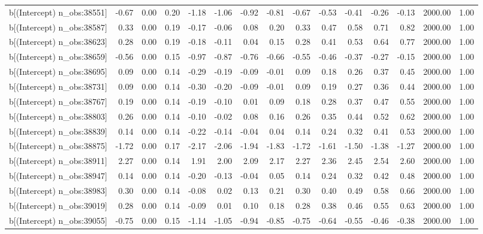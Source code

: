 \begin{table}[ht]
\begin{tabular}{rrrrrrrrrrrrrrr}
  b[(Intercept) n\_obs:38551] & -0.67 & 0.00 & 0.20 & -1.18 & -1.06 & -0.92 & -0.81 & -0.67 & -0.53 & -0.41 & -0.26 & -0.13 & 2000.00 & 1.00 \\ 
  b[(Intercept) n\_obs:38587] & 0.33 & 0.00 & 0.19 & -0.17 & -0.06 & 0.08 & 0.20 & 0.33 & 0.47 & 0.58 & 0.71 & 0.82 & 2000.00 & 1.00 \\ 
  b[(Intercept) n\_obs:38623] & 0.28 & 0.00 & 0.19 & -0.18 & -0.11 & 0.04 & 0.15 & 0.28 & 0.41 & 0.53 & 0.64 & 0.77 & 2000.00 & 1.00 \\ 
  b[(Intercept) n\_obs:38659] & -0.56 & 0.00 & 0.15 & -0.97 & -0.87 & -0.76 & -0.66 & -0.55 & -0.46 & -0.37 & -0.27 & -0.15 & 2000.00 & 1.00 \\ 
  b[(Intercept) n\_obs:38695] & 0.09 & 0.00 & 0.14 & -0.29 & -0.19 & -0.09 & -0.01 & 0.09 & 0.18 & 0.26 & 0.37 & 0.45 & 2000.00 & 1.00 \\ 
  b[(Intercept) n\_obs:38731] & 0.09 & 0.00 & 0.14 & -0.30 & -0.20 & -0.09 & -0.01 & 0.09 & 0.19 & 0.27 & 0.36 & 0.44 & 2000.00 & 1.00 \\ 
  b[(Intercept) n\_obs:38767] & 0.19 & 0.00 & 0.14 & -0.19 & -0.10 & 0.01 & 0.09 & 0.18 & 0.28 & 0.37 & 0.47 & 0.55 & 2000.00 & 1.00 \\ 
  b[(Intercept) n\_obs:38803] & 0.26 & 0.00 & 0.14 & -0.10 & -0.02 & 0.08 & 0.16 & 0.26 & 0.35 & 0.44 & 0.52 & 0.62 & 2000.00 & 1.00 \\ 
  b[(Intercept) n\_obs:38839] & 0.14 & 0.00 & 0.14 & -0.22 & -0.14 & -0.04 & 0.04 & 0.14 & 0.24 & 0.32 & 0.41 & 0.53 & 2000.00 & 1.00 \\ 
  b[(Intercept) n\_obs:38875] & -1.72 & 0.00 & 0.17 & -2.17 & -2.06 & -1.94 & -1.83 & -1.72 & -1.61 & -1.50 & -1.38 & -1.27 & 2000.00 & 1.00 \\ 
  b[(Intercept) n\_obs:38911] & 2.27 & 0.00 & 0.14 & 1.91 & 2.00 & 2.09 & 2.17 & 2.27 & 2.36 & 2.45 & 2.54 & 2.60 & 2000.00 & 1.00 \\ 
  b[(Intercept) n\_obs:38947] & 0.14 & 0.00 & 0.14 & -0.20 & -0.13 & -0.04 & 0.05 & 0.14 & 0.24 & 0.32 & 0.42 & 0.48 & 2000.00 & 1.00 \\ 
  b[(Intercept) n\_obs:38983] & 0.30 & 0.00 & 0.14 & -0.08 & 0.02 & 0.13 & 0.21 & 0.30 & 0.40 & 0.49 & 0.58 & 0.66 & 2000.00 & 1.00 \\ 
  b[(Intercept) n\_obs:39019] & 0.28 & 0.00 & 0.14 & -0.09 & 0.01 & 0.10 & 0.18 & 0.28 & 0.38 & 0.46 & 0.55 & 0.63 & 2000.00 & 1.00 \\ 
  b[(Intercept) n\_obs:39055] & -0.75 & 0.00 & 0.15 & -1.14 & -1.05 & -0.94 & -0.85 & -0.75 & -0.64 & -0.55 & -0.46 & -0.38 & 2000.00 & 1.00 \\ 

\end{tabular}
\end{table}
